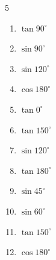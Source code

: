 \begin{multicols}{5}
\begin{enumerate}

  \item $\displaystyle \tan{90^\circ}$

        \phantom{$\displaystyle なし$}

  \item $\displaystyle \sin{90^\circ}$

        \phantom{$\displaystyle =1$}

  \item $\displaystyle \sin{120^\circ}$


  \item $\displaystyle \cos{180^\circ}$

        \phantom{$\displaystyle =-1$}

  \item $\displaystyle \tan{0^\circ}$

        \phantom{$\displaystyle =0$}

  \item $\displaystyle \tan{150^\circ}$


  \item $\displaystyle \sin{120^\circ}$


  \item $\displaystyle \tan{180^\circ}$

        \phantom{$\displaystyle =0$}

  \item $\displaystyle \sin{45^\circ}$


  \item $\displaystyle \sin{60^\circ}$


  \item $\displaystyle \tan{150^\circ}$


\columnbreak %

\resetques

  \item $\displaystyle \cos{180^\circ}$


\end{enumerate}
\end{multicols}
